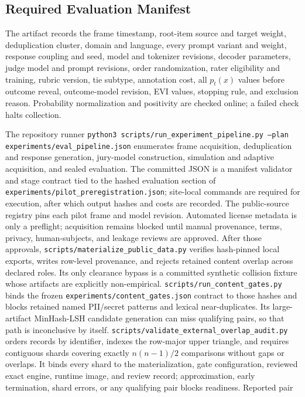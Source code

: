 \documentclass{article}
\begin{document}
\subsection{Required Evaluation Manifest}
The artifact records the frame timestamp, root-item source and target weight,
deduplication cluster, domain and language, every prompt variant and weight,
response coupling and seed, model and tokenizer revisions, decoder parameters,
judge model and prompt revisions, order randomization, rater eligibility and
training, rubric version, tie subtype, annotation cost, all $p_t(x)$ values
before outcome reveal, outcome-model revision, EVI values, stopping
rule, and exclusion reason. Probability normalization and positivity are
checked online; a failed check halts collection.

The repository runner
\texttt{python3 scripts/run\_experiment\_pipeline.py
--plan experiments/eval\_pipeline.json} enumerates frame acquisition,
deduplication and response generation, jury-model construction, simulation and
adaptive acquisition, and sealed evaluation. The committed JSON is a manifest
validator and stage contract tied to the hashed evaluation section of
\texttt{experiments/pilot\_preregistration.json}; site-local commands are
required for execution, after which output hashes and costs are recorded.
The public-source registry pins each pilot frame and model revision.
Automated license metadata is only a preflight; acquisition remains blocked
until manual provenance, terms, privacy, human-subjects, and leakage reviews
are approved.
After those approvals, \texttt{scripts/materialize\_public\_data.py} verifies
hash-pinned local exports, writes row-level provenance, and rejects retained
content overlap across declared roles. Its only clearance bypass is a
committed synthetic collision fixture whose artifacts are explicitly
non-empirical.
\texttt{scripts/run\_content\_gates.py} binds the frozen
\texttt{experiments/content\_gates.json} contract to those hashes and blocks
retained named PII/secret patterns and lexical near-duplicates. Its
large-artifact MinHash-LSH candidate generation can miss qualifying pairs, so
that path is inconclusive by itself.
\texttt{scripts/validate\_external\_overlap\_audit.py} orders records by
identifier, indexes the row-major upper triangle, and requires contiguous
shards covering exactly $n(n-1)/2$ comparisons without gaps or overlaps. It
binds every shard to the materialization, gate configuration, reviewed exact
engine, runtime image, and review record; approximation, early termination,
shard errors, or any qualifying pair blocks readiness. Reported pair
\end{document}
